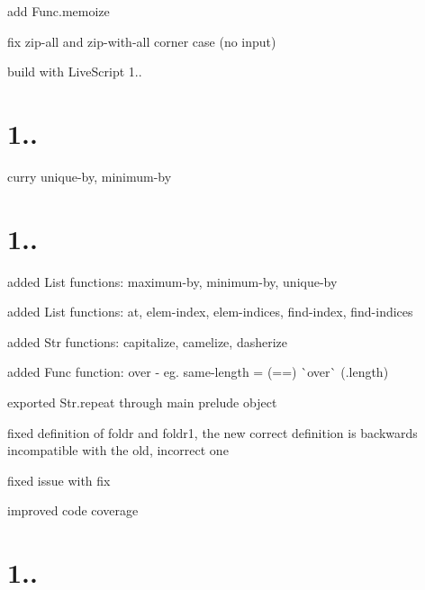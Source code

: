 
\begin{DoxyItemize}
\item add {\ttfamily Func.\+memoize}
\item fix {\ttfamily zip-\/all} and {\ttfamily zip-\/with-\/all} corner case (no input)
\item build with Live\+Script 1..
\end{DoxyItemize}

\section*{1..}


\begin{DoxyItemize}
\item curry {\ttfamily unique-\/by}, {\ttfamily minimum-\/by}
\end{DoxyItemize}

\section*{1..}


\begin{DoxyItemize}
\item added {\ttfamily List} functions\+: {\ttfamily maximum-\/by}, {\ttfamily minimum-\/by}, {\ttfamily unique-\/by}
\item added {\ttfamily List} functions\+: {\ttfamily at}, {\ttfamily elem-\/index}, {\ttfamily elem-\/indices}, {\ttfamily find-\/index}, {\ttfamily find-\/indices}
\item added {\ttfamily Str} functions\+: {\ttfamily capitalize}, {\ttfamily camelize}, {\ttfamily dasherize}
\item added {\ttfamily Func} function\+: {\ttfamily over} -\/ eg. {\ttfamily same-\/length = (==) \`{}over\`{} (.length)}
\item exported {\ttfamily Str.\+repeat} through main {\ttfamily prelude} object
\item fixed definition of {\ttfamily foldr} and {\ttfamily foldr1}, the new correct definition is backwards incompatible with the old, incorrect one
\item fixed issue with {\ttfamily fix}
\item improved code coverage
\end{DoxyItemize}

\section*{1..}


